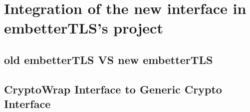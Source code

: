 \chapter{Integration of the new interface in embetterTLS's project}

\section{old embetterTLS VS new embetterTLS}


\section{CryptoWrap Interface to Generic Crypto Interface}

